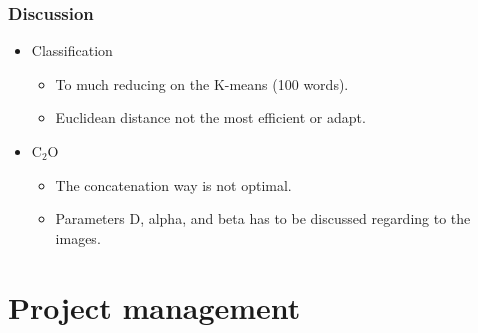 \documentclass[xcolor=table]{beamer}
\begin{document}
\begin{frame} \frametitle{Discussion}

\begin{itemize}
    \item Classification
    \vspace{0.3cm}
    \begin{itemize}
        \item To much reducing on the K-means (100 words).
        \vspace{0.15cm}
        \item Euclidean distance not the most efficient or adapt.
    \end{itemize}
    \vspace{0.7cm}
    \item C$_2$O
    \vspace{0.3cm}
    \begin{itemize}
        \item The concatenation way is not optimal.
        \item Parameters D, alpha, and beta has to be discussed regarding to the images.
    \end{itemize}
\end{itemize}
\end{frame}


\section{Project management}
\end{document}
